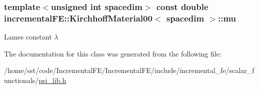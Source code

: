 \subsubsection[{\texorpdfstring{mu}{mu}}]{\setlength{\rightskip}{0pt plus 5cm}template$<$unsigned int spacedim$>$ const double {\bf incremental\+F\+E\+::\+Kirchhoff\+Material00}$<$ spacedim $>$\+::mu\hspace{0.3cm}{\ttfamily [private]}}\hypertarget{classincremental_f_e_1_1_kirchhoff_material00_a27770f7ae063508ca40aa009925c4a0b}{}\label{classincremental_f_e_1_1_kirchhoff_material00_a27770f7ae063508ca40aa009925c4a0b}
Lame\textquotesingle{}s constant $\lambda$ 

The documentation for this class was generated from the following file\+:\begin{DoxyCompactItemize}
\item 
/home/sst/code/\+Incremental\+F\+E/\+Incremental\+F\+E/include/incremental\+\_\+fe/scalar\+\_\+functionals/\hyperlink{psi__lib_8h}{psi\+\_\+lib.\+h}\end{DoxyCompactItemize}
